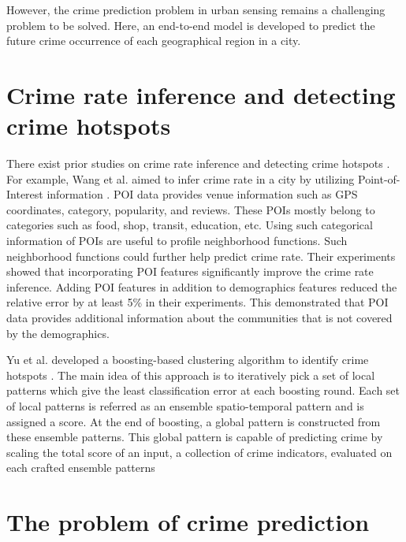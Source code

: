 \noindent However, the crime prediction problem in urban sensing remains a challenging 
problem to be solved. Here, an end-to-end model is developed to predict the future crime 
occurrence of each geographical region in a city.

\section{Crime rate inference and detecting crime hotspots}
There exist prior studies on crime rate inference and detecting crime 
hotspots \cite{p7,p2}. 
For example, Wang et al. aimed to
infer crime rate in a city by utilizing Point-of-Interest 
information \cite{p7}. 
POI data provides venue information such as GPS coordinates, category, 
popularity, and reviews. 
These POIs mostly belong to categories such as food, shop, transit, education, etc. 
Using such categorical information of POIs are useful to profile neighborhood 
functions. Such 
neighborhood functions could further help predict crime rate. Their experiments 
showed that 
incorporating POI features significantly improve the crime rate inference. Adding
POI features in addition to demographics features reduced the relative error 
by at least 5\% in 
their experiments. This demonstrated that POI data provides additional 
information about the communities that is not covered by the demographics.

\noindent Yu et al. developed a boosting-based clustering algorithm
to identify crime hotspots \cite{p2}. The main idea of this approach is
to iteratively pick a set of local patterns which give the least classification error
at each boosting round. Each set of local patterns is referred as an ensemble
spatio-temporal pattern and is assigned a score. At the end of boosting, a global 
pattern is constructed from these ensemble patterns. This global pattern is capable 
of predicting crime by scaling the total score of an input, a collection of crime 
indicators, evaluated on each crafted ensemble patterns 

\section{The problem of crime prediction}

